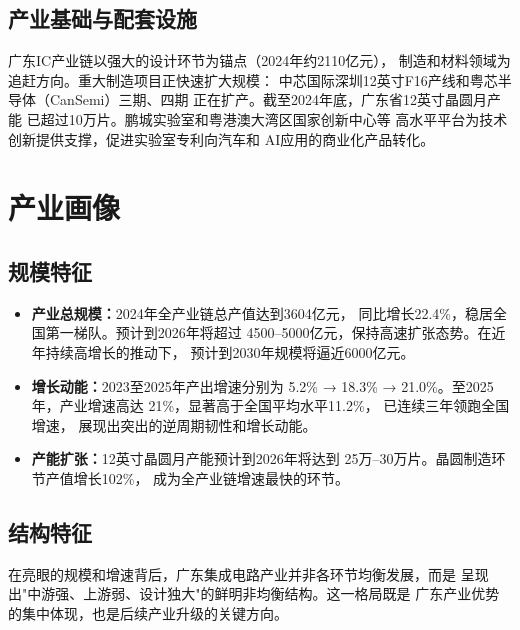 \documentclass[12pt,a4paper]{article}
\begin{document}
\subsection{产业基础与配套设施}
\label{sec:infrastructure}

广东IC产业链以强大的设计环节为锚点（2024年约2110亿元），
制造和材料领域为追赶方向。重大制造项目正快速扩大规模：
中芯国际深圳12英寸F16产线和粤芯半导体（CanSemi）三期、四期
正在扩产。截至2024年底，广东省12英寸晶圆月产能
已超过10万片。鹏城实验室和粤港澳大湾区国家创新中心等
高水平平台为技术创新提供支撑，促进实验室专利向汽车和
AI应用的商业化产品转化。

\section{产业画像}
\label{sec:industry}

\subsection{规模特征}
\label{sec:scale}

\begin{itemize}
    \item \textbf{产业总规模：}2024年全产业链总产值达到3604亿元，
    同比增长22.4\%，稳居全国第一梯队。预计到2026年将超过
    4500--5000亿元，保持高速扩张态势。在近年持续高增长的推动下，
    预计到2030年规模将逼近6000亿元。
    \item \textbf{增长动能：}2023至2025年产出增速分别为
    5.2\% → 18.3\% → 21.0\%。至2025年，产业增速高达
    21\%，显著高于全国平均水平11.2\%，
    已连续三年领跑全国增速，
    展现出突出的逆周期韧性和增长动能。
    \item \textbf{产能扩张：}12英寸晶圆月产能预计到2026年将达到
    25万--30万片。晶圆制造环节产值增长102\%，
    成为全产业链增速最快的环节。

\end{itemize}


\subsection{结构特征}
\label{sec:structure2}

在亮眼的规模和增速背后，广东集成电路产业并非各环节均衡发展，而是
呈现出"中游强、上游弱、设计独大"的鲜明非均衡结构。这一格局既是
广东产业优势的集中体现，也是后续产业升级的关键方向。
\end{document}
